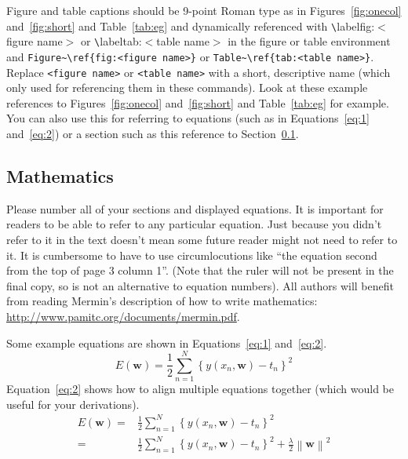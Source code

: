 \documentclass[12pt,twoside,a4paper]{article}
\begin{document}
Figure and table captions should be 9-point Roman type as in Figures~\ref{fig:onecol} and~\ref{fig:short} and Table~\ref{tab:eg} and dynamically referenced with \verb'\'label{fig:$<$figure name$>$} or \verb'\'label{tab:$<$table name$>$} in the figure or table environment and \verb'Figure~\ref{fig:<figure name>}' or \verb'Table~\ref{tab:<table name>}'.  Replace \verb'<figure name>' or \verb'<table name>' with a short, descriptive name (which only used for referencing them in these commands).  Look at these example references to Figures~\ref{fig:onecol} and~\ref{fig:short} and Table~\ref{tab:eg} for example. You can also use this for referring to equations (such as in Equations~\ref{eq:1} and~\ref{eq:2}) or a section such as this reference to Section~\ref{sec:mat}.

\subsection{Mathematics}\label{sec:mat}

Please number all of your sections and displayed equations.  It is
important for readers to be able to refer to any particular equation.  Just
because you didn't refer to it in the text doesn't mean some future reader
might not need to refer to it.  It is cumbersome to have to use
circumlocutions like ``the equation second from the top of page 3 column
1''.  (Note that the ruler will not be present in the final copy, so is not
an alternative to equation numbers).  All authors will benefit from reading
Mermin's description of how to write mathematics:
\url{http://www.pamitc.org/documents/mermin.pdf}.

Some example equations are shown in Equations~\ref{eq:1} and~\ref{eq:2}.
\begin{equation} \label{eq:1}
E(\mathbf{w}) = \frac{1}{2} \sum_{n=1}^N \left\lbrace y(x_n,\mathbf{w})-t_n\right\rbrace^2
\end{equation}
Equation~\ref{eq:2} shows how to align multiple equations together (which would be useful for your derivations).
\begin{align} \label{eq:2}
E(\mathbf{w}) =& \frac{1}{2} \sum_{n=1}^N \left\lbrace y(x_n,\mathbf{w})-t_n\right\rbrace^2 \\
              =& \frac{1}{2} \sum_{n=1}^N \left\lbrace y(x_n,\mathbf{w})-t_n\right\rbrace^2 + \frac{\lambda}{2} \left\lVert\mathbf{w}\right\rVert^2
\end{align}
\end{document}
